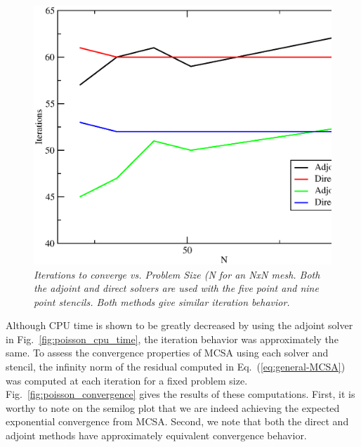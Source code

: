 \documentclass[preprint,12pt]{elsarticle}
\begin{document}
\begin{figure}[htbp!]
  \centering
  \includegraphics[width=5in,clip]{Adjoint_Direct_Iterations.eps}
  \caption{\sl Iterations to converge vs. Problem Size (N for an NxN
    mesh. Both the adjoint and direct solvers are used with the five
    point and nine point stencils. Both methods give similar iteration
    behavior.}
  \label{fig:poisson_iterations}
\end{figure}

Although CPU time is shown to be greatly decreased by using the
adjoint solver in Fig.~\ref{fig:poisson_cpu_time}, the iteration
behavior was approximately the same. To assess the convergence
properties of MCSA using each solver and stencil, the infinity norm of
the residual computed in Eq.~(\ref{eq:general-MCSA}) was computed at
each iteration for a fixed problem
size. Fig.~\ref{fig:poisson_convergence} gives the results of these
computations. First, it is worthy to note on the semilog plot that we
are indeed achieving the expected exponential convergence from
MCSA. Second, we note that both the direct and adjoint methods have
approximately equivalent convergence behavior. 
\end{document}
